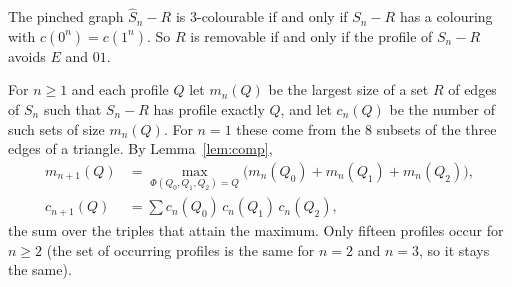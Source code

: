 \documentclass[11pt]{amsart}
\theoremstyle{remark}
\newcommand{\Sh}{\widehat S}
\begin{document}
The pinched graph $\Sh_n-R$ is $3$-colourable if and only if $S_n-R$ has a colouring with $c(0^n)=c(1^n)$. So
$R$ is removable if and only if the profile of $S_n-R$ avoids $E$ and $01$.

For $n\ge1$ and each profile $Q$ let $m_n(Q)$ be the largest size of a set $R$ of edges of $S_n$ such that $S_n-R$
has profile exactly $Q$, and let $c_n(Q)$ be the number of such sets of size $m_n(Q)$. For $n=1$ these come from the $8$ subsets of
the three edges of a triangle. By Lemma~\ref{lem:comp},
\begin{align*}
m_{n+1}(Q)&=\max_{\Phi(Q_0,Q_1,Q_2)=Q}\bigl(m_n(Q_0)+m_n(Q_1)+m_n(Q_2)\bigr),\\
c_{n+1}(Q)&=\sum c_n(Q_0)\,c_n(Q_1)\,c_n(Q_2),
\end{align*}
the sum over the triples that attain the maximum. Only fifteen profiles occur for $n\ge2$ (the set of occurring
profiles is the same for $n=2$ and $n=3$, so it stays the same).
\end{document}
